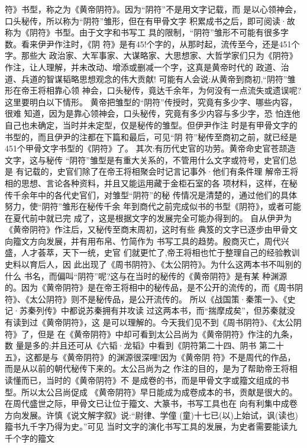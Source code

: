 \documentclass[12pt,UTF8]{ctexbook}
\begin{document}
符》书型，称之为《黄帝阴符》。因为“阴符”不是用文字记载，而
是以心领神会，口头秘传，所以称为“阴符”雏形，但在有甲骨文字
积累成书之后，即可阅读·故称为《阴符》书型。由于文字和书写工
具的限制，“阴符”雏形不可能有很多字数。看来伊尹作注时，《阴
符》是有45!个字的，从那时起，流传至今，还是451个字。那些大
政治家、大军事家、大谋略家、大思想家、大哲学家们只为《阴符》作注，让人理解，并未改动、增添或删减一个字，这真是黄帝时代的
政道、治道、兵道的智谋韬略思想观念的伟大贡献!
可能有人会说:从黄帝到商初,“阴符”雏形在帝王将相靠心领
神会，口头秘传，竟达千余年，为何没有一点流失或遗误呢?
这里要明白以下情形。
黄帝把雏型的“阴符”传授时，究竟有多少字、哪些内容，很难
知道，因为是靠心领神会，口头秘传，究竟有多少内容与多少字，恐
怕连他自己也未确定，当时并未定型，仅是秘传的雏型。但伊尹作注
时是有甲骨文字的书型的，而且伊尹的注都在下篇和最后，可见“阴
符”秘传至商初之前，就已经是451个甲骨文字书型的《阴符》了。
其次:有历代史官的功劳。黄帝命史官苍颉造文字，这与秘传
“阴符”雏型是有重大关系的，不管用什么文字或符号，史官们总是
有记载的，史官们除了在帝王将相聚会时记言记事外·他们有条件理
解帝王将相的思想、言论各种资料，并且又能运用藏于金柜石室的各
项材料，这样，在秘传千余年中的各代史官们，对雏型“阴符”的秘
传情况是清楚的，通过他们的具体努力，使“阴符”雏形在秘传千余
年到商代之前完成似书的书型《阴符》，或者可能在夏代前中就已完
成了，这是根据文字的发展完全可能办得到的。
自从伊尹为《黄帝阴符》作注后，又秘传至商末周初，这时有些
典笈的文字已逐步由甲骨文向籀文方向发展，并有用布帛、竹简作为
书写工具的趋势。殷商灭亡，周代兴盛，人才荟萃，天下一统，史官
们就更忙了,帝王将相也忙于整理自己的经验教训史料以育后人，因
此出现了《周书阴符》、《太公阴符》。为什么这两本书不叫别的什么
书名，而偏叫“阴符”呢?这与在当时的秘传的《黄帝阴符》是有某
种渊源的。因为《黄帝阴符》是在帝王将相中的秘传品，是不公开的流传的，而《周书阴符》、《太公阴符》则不是秘传品，是公开流传的。
所以《战国策·秦策一》、《史记·苏秦列传》中都说苏秦拥有并攻读
过这两本书，而“揣摩成矣”，但苏秦就没有读到过《黄帝阴符》，这
是可以理解的。今天我们见不到《周书阴符》、《太公阴符》了，但是
在《黄帝阴符》中却可看到太公吕尚为《黄帝阴符》作注的九条，数
量是多的;并且还可从《六韬·龙韬》中看到《阴符第二十四、阴书
第二十五》，这都是与《黄帝阴符》的渊源很深哩!因为《黄帝阴
符》不是周代的作品，而是从以前的朝代秘传下来的。太公吕尚为之
作注的目的，是为了帮助帝王将相读懂而已，当时的《黄帝阴符》不
是成卷的书，而是甲骨文字或籀文组成的书型。所以太公吕尚促成
《黄帝阴符》早日能成为成卷成本的书，贡献是很大的。
在周代盛世之际，甲骨文已让位于籀文、大篆书，书写工具也在
向有利集中成卷方向发展。许慎《说文解字叙》说:“尉律、学僮
(童)十七已(以)上始试，讽(读也)籀书九千字乃得为史。”可见
当时文字的演化书写工具的发展，为史者需要能读九千个字的籀文
\end{document}
